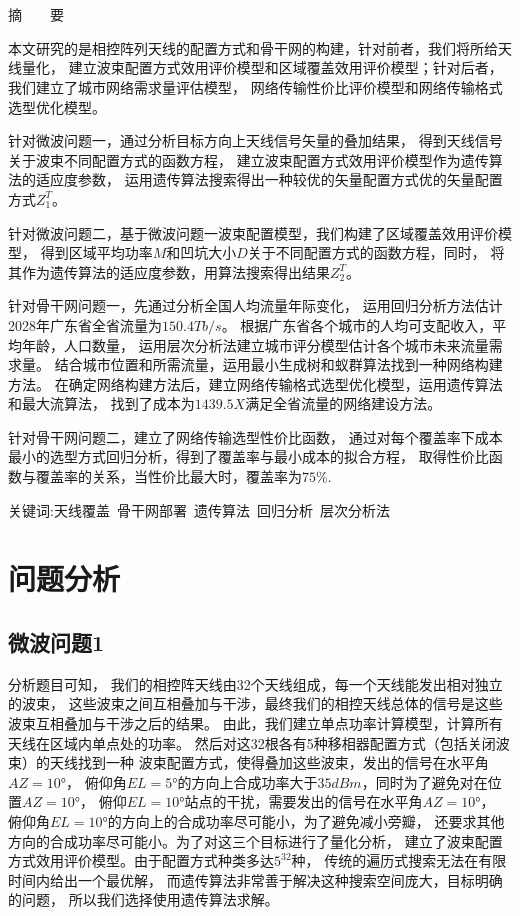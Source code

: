 \documentclass[UTF8,12pt]{ctexart}
\begin{document}
\section*{}%
    \centerline{\textsf{摘\ \ \ \ 要}}
    本文研究的是相控阵列天线的配置方式和骨干网的构建，针对前者，我们将所给天线量化，
    建立波束配置方式效用评价模型和区域覆盖效用评价模型；针对后者，
    我们建立了城市网络需求量评估模型，
    网络传输性价比评价模型和网络传输格式选型优化模型。\par
    针对微波问题一，通过分析目标方向上天线信号矢量的叠加结果，
    得到天线信号关于波束不同配置方式的函数方程，
    建立波束配置方式效用评价模型作为遗传算法的适应度参数，
    运用遗传算法搜索得出一种较优的矢量配置方式优的矢量配置方式$Z_1^{T}$。\par
    针对微波问题二，基于微波问题一波束配置模型，我们构建了区域覆盖效用评价模型，
    得到区域平均功率$M$和凹坑大小$D$关于不同配置方式的函数方程，同时，
    将其作为遗传算法的适应度参数，用算法搜索得出结果$Z_2^{T}$。\par
    针对骨干网问题一，先通过分析全国人均流量年际变化，
    运用回归分析方法估计2028年广东省全省流量为$150.4Tb/s$。
    根据广东省各个城市的人均可支配收入，平均年龄，人口数量，
    运用层次分析法建立城市评分模型估计各个城市未来流量需求量。
    结合城市位置和所需流量，运用最小生成树和蚁群算法找到一种网络构建方法。
    在确定网络构建方法后，建立网络传输格式选型优化模型，运用遗传算法和最大流算法，
    找到了成本为$1439.5X$满足全省流量的网络建设方法。\par
    针对骨干网问题二，建立了网络传输选型性价比函数，
    通过对每个覆盖率下成本最小的选型方式回归分析，得到了覆盖率与最小成本的拟合方程，
    取得性价比函数与覆盖率的关系，当性价比最大时，覆盖率为$75\%$.\par

\textsf{关键词:天线覆盖\ 骨干网部署\ 遗传算法\ 回归分析\ 层次分析法}
\newpage



\section{问题分析}
    \subsection{微波问题1}分析题目可知，
        我们的相控阵天线由32个天线组成，每一个天线能发出相对独立的波束，
        这些波束之间互相叠加与干涉，最终我们的相控天线总体的信号是这些波束互相叠加与干涉之后的结果。
        由此，我们建立单点功率计算模型，计算所有天线在区域内单点处的功率。
        然后对这32根各有5种移相器配置方式（包括关闭波束）的天线找到一种
        波束配置方式，使得叠加这些波束，发出的信号在水平角$AZ = 10°$，
        俯仰角$EL= 5°$的方向上合成功率大于$35dBm$，同时为了避免对在位置$AZ=10°$，
        俯仰$EL=10°$站点的干扰，需要发出的信号在水平角$AZ=10°$，
        俯仰角$EL=10°$的方向上的合成功率尽可能小，为了避免减小旁瓣，
        还要求其他方向的合成功率尽可能小。为了对这三个目标进行了量化分析，
        建立了波束配置方式效用评价模型。由于配置方式种类多达$5^{32}$种，
        传统的遍历式搜索无法在有限时间内给出一个最优解，
        而遗传算法非常善于解决这种搜索空间庞大，目标明确的问题，
        所以我们选择使用遗传算法求解。
\end{document}

